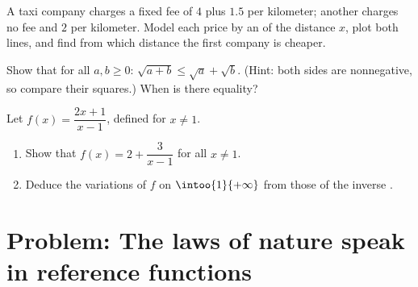 \begin{exercise}[$\star\star$]\label{exo:g10:reffunc:8}
A taxi company charges a fixed fee of $4$ plus $1.5$ per kilometer;
another charges no fee and $2$ per kilometer. Model each price by an
 of the distance $x$, plot both lines, and find from which
distance the first company is cheaper.
\end{exercise}

\begin{exercise}[$\star\star$]\label{exo:g10:reffunc:9}
Show that for all $a, b \geq 0$: $\sqrt{a + b} \leq \sqrt a + \sqrt b$.
(Hint: both sides are nonnegative, so compare their squares.) When is
there equality?
\end{exercise}

\begin{exercise}[$\star\star\star$]\label{exo:g10:reffunc:10}
Let $f(x) = \dfrac{2x + 1}{x - 1}$, defined for $x \neq 1$.
\begin{enumerate}
  \item Show that $f(x) = 2 + \dfrac{3}{x - 1}$ for all $x \neq 1$.
  \item Deduce the variations of $f$ on $\intoo{1}{+\infty}$ from those
        of the inverse .
\end{enumerate}
\end{exercise}

\section{Problem: The laws of nature speak in reference functions}


